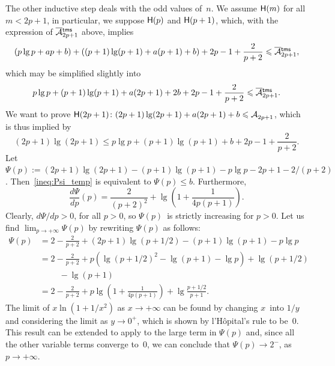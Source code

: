 The other inductive step deals with the odd values of~\(n\). We assume
\(\textsf{H}({m})\) for all \(m < 2p+1\), in particular, we suppose
\(\textsf{H}({p})\) and \(\textsf{H}({p+1})\), which, with the expression of
\(\OM{\fun{tms}}{2p+1}\) above, implies
\begin{equation*}
(p\lg p + ap + b) + ((p+1)\lg(p+1) + a(p+1) + b) + 2p - 1 +
\frac{2}{p+2} \leqslant \OM{\fun{tms}}{2p+1},
\end{equation*}
which may be simplified slightly into
\begin{equation*}
p\lg p + (p+1)\lg(p+1) + a(2p+1) + 2b + 2p - 1 + \frac{2}{p+2}
\leqslant \OM{\fun{tms}}{2p+1}.
\end{equation*}
We want to prove \(\textsf{H}({2p+1}) \colon (2p+1)\lg(2p+1) +
a(2p+1) + b \leqslant \mathcal{A}_{2p+1}^{}\), which is thus implied by
\begin{equation}
  (2p+1)\lg(2p+1) \leqslant
  p\lg p + (p+1)\lg(p+1) + b + 2p - 1 + \frac{2}{p+2}.
\label{ineq:Psi_temp}
\end{equation}
Let \(\Psi(p) := (2p+1)\lg(2p+1) - (p+1)\lg(p+1) - p\lg p -
2p + 1 - 2/(p+2)\). Then~\eqref{ineq:Psi_temp} is equivalent to
\(\Psi(p) \leqslant b\). Furthermore,
\begin{equation*}
\frac{d\Psi}{dp}(p) = \frac{2}{(p+2)^2} + \lg\left(1+\frac{1}{4p(p+1)}\right).
\end{equation*}
Clearly, \(d\Psi/dp > 0\), for all \(p > 0\), so \(\Psi(p)\)~is
strictly increasing for \(p > 0\). Let us find \(\lim_{p \to
  +\infty}\Psi(p)\) by rewriting \(\Psi(p)\) as follows:
\begin{align*}
\Psi(p)
  &= 2 - \frac{2}{p+2} + (2p+1)\lg(p+1/2) - (p+1)\lg(p+1)
     - p\lg p\\
  &= 2 - \frac{2}{p+2} + p\left(\lg(p+1/2)^2 - \lg(p+1)
   - \lg p\right) + \lg(p+1/2)\\
  &\phantom{=} \quad - \lg(p+1)\\
  &= 2 - \frac{2}{p+2} + p\lg\left(1 + \frac{1}{4p(p+1)}\right) +
  \lg\frac{p + 1/2}{p+1}.
\end{align*}
The limit of \(x\ln(1+1/x^2)\) as \(x \to +\infty\) can be found by
changing \(x\)~into \(1/y\) and considering the limit as \(y \to
0^{+}\), which is shown by l'H\^{o}pital's rule to be~\(0\). This
result can be extended to apply to the large term in \(\Psi(p)\) and,
since all the other variable terms converge to~\(0\), we can conclude
that \(\Psi(p) \to 2^{-}\), as \(p \to +\infty\).

